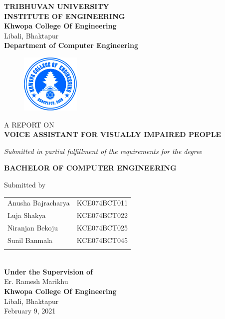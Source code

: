 	\begin{center}
		\thispagestyle{empty}
		\Large\textbf{TRIBHUVAN UNIVERSITY}\\
		\Large\textbf{INSTITUTE OF ENGINEERING }\\
		\vspace{0.2in}
		\large{\textbf{Khwopa College Of Engineering}\\}
		\normalsize{Libali, Bhaktapur\\}
		\large\textbf{Department of Computer Engineering}
		\vspace{0.3in}
		\begin{figure}[h]
		    \centering
			    \includegraphics[width=0.25\textwidth]{img/Khwopalogo.jpg}
		\end{figure}
		
		\vspace{0.4in}
		\large{A REPORT  ON\\\textbf{\MakeUppercase{Voice Assistant for Visually Impaired People}}\\}
		
		\vspace{0.3in}
		\large{\textit{Submitted in partial fulfillment of the requirements for the degree\\}}
		
		\vspace{0.3in}
		\large{\textbf{BACHELOR OF COMPUTER ENGINEERING}\\}
		
		\vspace{0.4in}
		\large{Submitted by}\\
		\begin{tabular}{p{3.5in}p{3in}}
			\hspace{0.3cm}Anusha Bajracharya & KCE074BCT011\\
			\hspace{0.3cm}Luja Shakya & KCE074BCT022\\
			\hspace{0.3cm}Niranjan Bekoju & KCE074BCT025\\
			\hspace{0.3cm}Sunil Banmala & KCE074BCT045\\
		 \vspace{0.3in}
		\end{tabular}
		\\
		\large{\textbf{Under the Supervision of}}\\
			\normalsize{Er. Ramesh Marikhu}\\ 

		\vspace{1cm}
		\large{\textbf{Khwopa College Of Engineering}\\}
			\normalsize{Libali, Bhaktapur\\
			February 9, 2021
		}
	\end{center}
